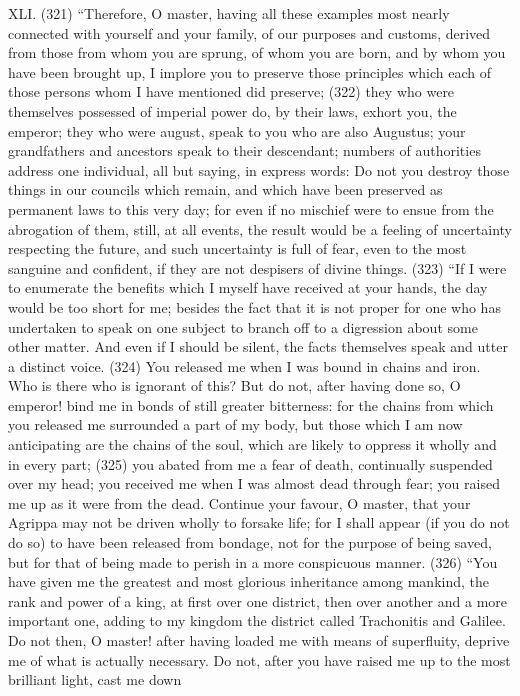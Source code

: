 XLI. (321) ``Therefore, O master, having all these examples most nearly connected with yourself
and your family, of our purposes and customs, derived from those from whom you are sprung, of
whom you are born, and by whom you have been brought up, I implore you to preserve those
principles which each of those persons whom I have mentioned did preserve; (322) they who were
themselves possessed of imperial power do, by their laws, exhort you, the emperor; they who were
august, speak to you who are also Augustus; your grandfathers and ancestors speak to their
descendant; numbers of authorities address one individual, all but saying, in express words: Do not
you destroy those things in our councils which remain, and which have been preserved as
permanent laws to this very day; for even if no mischief were to ensue from the abrogation of
them, still, at all events, the result would be a feeling of uncertainty respecting the future, and such
uncertainty is full of fear, even to the most sanguine and confident, if they are not despisers of
divine things. (323) ``If I were to enumerate the benefits which I myself have received at your
hands, the day would be too short for me; besides the fact that it is not proper for one who has
undertaken to speak on one subject to branch off to a digression about some other matter. And
even if I should be silent, the facts themselves speak and utter a distinct voice. (324) You released
me when I was bound in chains and iron. Who is there who is ignorant of this? But do not, after
having done so, O emperor! bind me in bonds of still greater bitterness: for the chains from which
you released me surrounded a part of my body, but those which I am now anticipating are the
chains of the soul, which are likely to oppress it wholly and in every part; (325) you abated from me
a fear of death, continually suspended over my head; you received me when I was almost dead
through fear; you raised me up as it were from the dead. Continue your favour, O master, that your
Agrippa may not be driven wholly to forsake life; for I shall appear (if you do not do so) to have
been released from bondage, not for the purpose of being saved, but for that of being made to
perish in a more conspicuous manner. (326) ``You have given me the greatest and most glorious
inheritance among mankind, the rank and power of a king, at first over one district, then over
another and a more important one, adding to my kingdom the district called Trachonitis and Galilee.
Do not then, O master! after having loaded me with means of superfluity, deprive me of what is
actually necessary. Do not, after you have raised me up to the most brilliant light, cast me down
